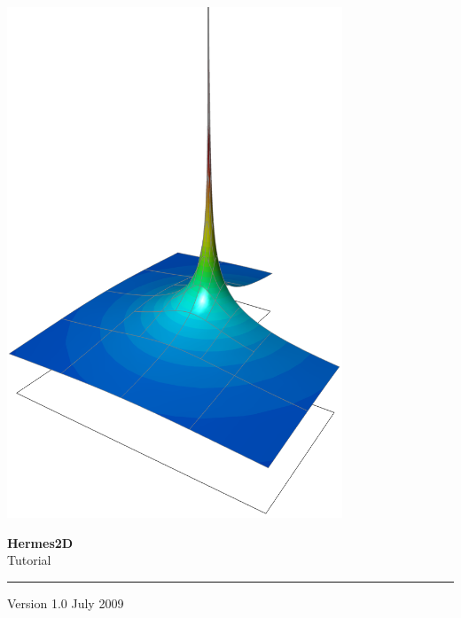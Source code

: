 

\pagestyle{empty}


\vspace*{0.8cm}

\begin{center}
\hspace{-8mm}\includegraphics[width=0.75\textwidth]{img/title.png}
\end{center}

\vspace{-0.3cm}

{\Huge\bf Hermes2D}\\[6mm]
{\LARGE Tutorial}\\[2mm]
\hrule

\vspace{3mm}
{\Large Version 1.0 \hfill July 2009}



\newpage
\pagestyle{plain}
